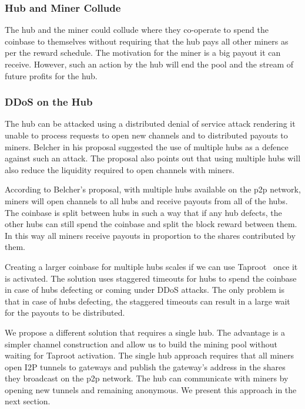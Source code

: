 \documentclass{article}
\begin{document}
\subsubsection{Hub and Miner Collude}\label{ref:collusion}

The hub and the miner could collude where they co-operate to spend the
coinbase to themselves without requiring that the hub pays all other
miners as per the reward schedule. The motivation for the miner is a
big payout it can receive. However, such an action by the hub will
end the pool and the stream of future profits for the hub.


\subsubsection{DDoS on the Hub}\label{ref:ddos-attack}

The hub can be attacked using a distributed denial of service attack
rendering it unable to process requests to open new channels and to
distributed payouts to miners. Belcher in his proposal suggested the
use of multiple hubs as a defence against such an attack. The proposal
also points out that using multiple hubs will also reduce the
liquidity required to open channels with miners.

According to Belcher's proposal, with multiple hubs available on the
p2p network, miners will open channels to all hubs and receive payouts
from all of the hubs. The coinbase is split between hubs in such a way
that if any hub defects, the other hubs can still spend the coinbase
and split the block reward between them. In this way all miners
receive payouts in proportion to the shares contributed by them.

Creating a larger coinbase for multiple hubs scales if we can use
Taproot~\cite{bip340,bip341, bip342} once it is activated. The
solution uses staggered timeouts for hubs to spend the coinbase in
case of hubs defecting or coming under DDoS attacks. The only problem
is that in case of hubs defecting, the staggered timeouts can result
in a large wait for the payouts to be distributed.

We propose a different solution that requires a single hub. The
advantage is a simpler channel construction and allow us to build the
mining pool without waiting for Taproot activation. The single hub
approach requires that all miners open I2P tunnels to gateways and
publish the gateway's address in the shares they broadcast on the p2p
network. The hub can communicate with miners by opening new tunnels
and remaining anonymous. We present this approach in the next section.
\end{document}

